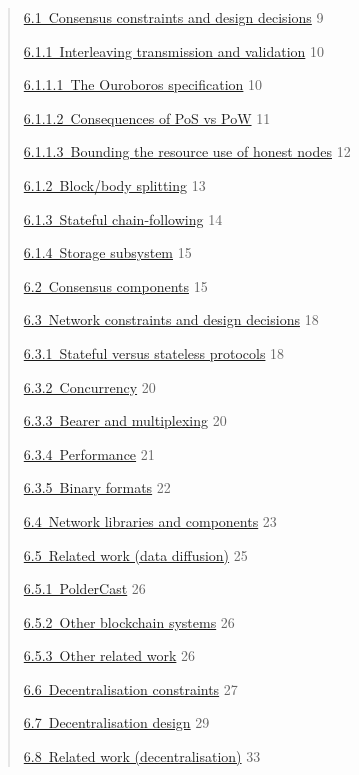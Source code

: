 \documentclass[]{article}
\begin{document}
\begin{quote}
\protect\hyperlink{consensus-constraints-and-design-decisions}{​6.1​~Consensus
constraints and design decisions} 9

\protect\hyperlink{interleaving-transmission-and-validation}{​6.1.1​~Interleaving
transmission and validation} 10

\protect\hyperlink{the-ouroboros-specification}{​6.1.1.1​~The Ouroboros
specification} 10

\protect\hyperlink{consequences-of-pos-vs-pow}{​6.1.1.2​~Consequences of
PoS vs PoW} 11

\protect\hyperlink{bounding-the-resource-use-of-honest-nodes}{​6.1.1.3​~Bounding
the resource use of honest nodes} 12

\protect\hyperlink{blockbody-splitting}{​6.1.2​~Block/body splitting} 13

\protect\hyperlink{stateful-chain-following}{​6.1.3​~Stateful
chain-following} 14

\protect\hyperlink{storage-subsystem}{​6.1.4​~Storage subsystem} 15

\protect\hyperlink{consensus-components}{​6.2​~Consensus components} 15

\protect\hyperlink{network-constraints-and-design-decisions}{​6.3​~Network
constraints and design decisions} 18

\protect\hyperlink{stateful-versus-stateless-protocols}{​6.3.1​~Stateful
versus stateless protocols} 18

\protect\hyperlink{concurrency}{​6.3.2​~Concurrency} 20

\protect\hyperlink{bearer-and-multiplexing}{​6.3.3​~Bearer and
multiplexing} 20

\protect\hyperlink{performance}{​6.3.4​~Performance} 21

\protect\hyperlink{binary-formats}{​6.3.5​~Binary formats} 22

\protect\hyperlink{network-libraries-and-components}{​6.4​~Network
libraries and components} 23

\protect\hyperlink{related-work-data-diffusion}{​6.5​~Related work (data
diffusion)} 25

\protect\hyperlink{poldercast}{​6.5.1​~PolderCast} 26

\protect\hyperlink{other-blockchain-systems}{​6.5.2​~Other blockchain
systems} 26

\protect\hyperlink{other-related-work}{​6.5.3​~Other related work} 26

\protect\hyperlink{decentralisation-constraints}{​6.6​~Decentralisation
constraints} 27

\protect\hyperlink{decentralisation-design}{​6.7​~Decentralisation
design} 29

\protect\hyperlink{related-work-decentralisation}{​6.8​~Related work
(decentralisation)} 33
\end{quote}
\end{document}
